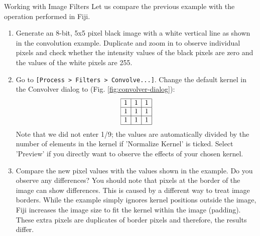 \begin{taskbox}{Working with Image Filters}
Let us compare the previous example with the operation performed in Fiji.

\begin{enumerate}
	\item Generate an 8-bit, 5x5 pixel black image with a white vertical line as shown in the convolution example. Duplicate and zoom in to observe individual pixels and check whether the intensity values of the black pixels are zero and the values of the white pixels are 255.
	\item Go to \texttt{[Process > Filters > Convolve...]}. Change the default kernel in the Convolver dialog to (Fig. \ref{fig:convolver-dialog}): 
	\[
		\begin{array}{|c|c|c|}
	\hline
	1&1&1\\
\hline
1&1&1\\
\hline
1&1&1\\
\hline
	\end{array}
\]
	Note that we did not enter 1/9; the values are automatically divided by the number of elements in the kernel if 'Normalize Kernel' is ticked. Select 'Preview' if you directly want to observe the effects of your chosen kernel.
	
	\begin{minipage}[t]{\linewidth}
		\begin{center}
		\medskip
		\label{fig:convolver-dialog}
		\end{center}
	\end{minipage}
	
	\item Compare the new pixel values with the values shown in the example. Do you observe any differences? You should note that pixels at the border of the image can show differences. This is caused by a different way to treat image borders. While the example simply ignores kernel positions outside the image, Fiji increases the image size to fit the kernel within the image (padding). These extra pixels are duplicates of border pixels and therefore, the results differ.
	
	\end{enumerate}
\end{taskbox}

